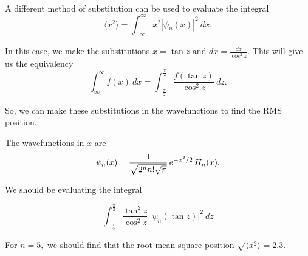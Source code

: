 \documentclass[11pt]{article}
\begin{document}
    \begin{center}
    \end{center}
    { \hspace*{\fill} \\}
    
    A different method of substitution can be used to evaluate the integral
\[\langle{x^2}\rangle = \int_{-\infty}^\infty x^2 |\psi_n(x)|^2 \ d x.\]

In this case, we make the substitutions
\(x = \tan{z} \text{ and } dx = \frac{dz}{\cos^2{z}}.\) This will give
us the equivalency
\[\int_\infty^\infty f(x)\ dx = \int_{-\frac{\pi}{2}}^{\frac{\pi}{2}} \frac{f(\tan{z})}{\cos^2{z}}\ dz.\]

So, we can make these substitutions in the wavefunctions to find the RMS
position.

The wavefunctions in \(x\) are
\[\psi_n(x) = {1\over\sqrt{2^n n!\sqrt{\pi}}}\, e^{-x^2/2}\,H_n(x).\]

We should be evaluating the integral

\[\int_{-\frac{\pi}{2}}^{\frac{\pi}{2}} \frac{\tan^2{z}}{\cos^2{z}} \biggr|\ \psi_n(\tan{z}) \biggr|^2 \ dz\]

For \(n=5,\) we should find that the root-mean-square position
\(\sqrt{\langle x^2 \rangle} = 2.3.\)
\end{document}
